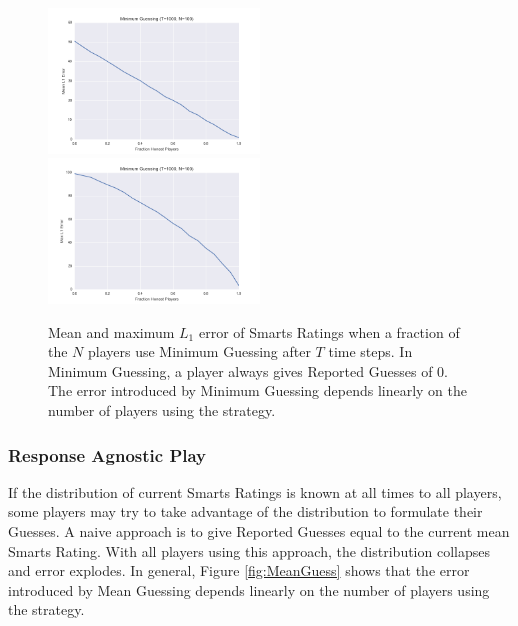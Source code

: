 \begin{figure}[H]
\centerline{%
\includegraphics[width=0.5\textwidth]{figures/robustness/Minimum_Guessing31.png}%
\includegraphics[width=0.5\textwidth] {figures/robustness/Minimum_Guessing32.png}%
}%
\caption{Mean and maximum $L_1$ error of Smarts Ratings when a fraction of the $N$ players use Minimum Guessing after $T$ time steps. In Minimum Guessing, a player always gives Reported Guesses of $0$. The error introduced by Minimum Guessing depends linearly on the number of players using the strategy.}
\label{fig:MinimumGuess}
\end{figure}

\subsubsection{Response Agnostic Play}

If the distribution of current Smarts Ratings is known at all times to all players, some players may try to take advantage of the distribution to formulate their Guesses. A naive approach is to give Reported Guesses equal to the current mean Smarts Rating. With all players using this approach, the distribution collapses and error explodes. In general, Figure \ref{fig:MeanGuess} shows that the error introduced by Mean Guessing depends linearly on the number of players using the strategy.

